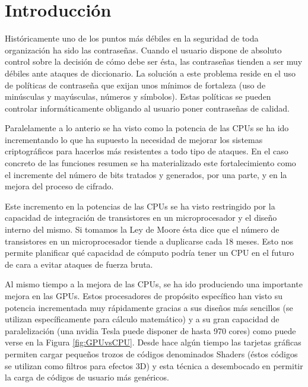 \chapter{Introducción}

Históricamente uno de los puntos más débiles en la seguridad de toda organización ha sido las contraseñas. Cuando el usuario dispone de absoluto control sobre la decisión de cómo debe ser ésta, las contraseñas tienden a ser muy débiles ante ataques de diccionario. La solución a este problema reside en el uso de políticas de contraseña que exijan unos mínimos de fortaleza (uso de minúsculas y mayúsculas, números y símbolos). Estas políticas se pueden controlar informáticamente obligando al usuario poner contraseñas de calidad.

Paralelamente a lo anterio se ha visto como la potencia de las CPUs se ha ido incrementando lo que ha supuesto la necesidad de mejorar los sistemas criptográficos para hacerlos más resistentes a todo tipo de ataques. En el caso concreto de las funciones resumen se ha materializado este fortalecimiento como el incremente del número de bits tratados y generados, por una parte, y en la mejora del proceso de cifrado.

Este incremento en la potencias de las CPUs se ha visto restringido por la capacidad de integración de transistores en un microprocesador y el diseño interno del mismo. Si tomamos la Ley de Moore ésta dice que el número de transistores en un microprocesador tiende a duplicarse cada 18 meses. Esto nos permite planificar qué capacidad de cómputo podría tener un CPU en el futuro de cara a evitar ataques de fuerza bruta.

Al mismo tiempo a la mejora de las CPUs, se ha ido produciendo una importante mejora en las GPUs. Estos procesadores de propósito específico han visto su potencia incrementada muy rápidamente gracias a sus diseños más sencillos (se utilizan específicamente para cálculo matemático) y a su gran capacidad de paralelización (una nvidia Tesla puede disponer de hasta 970 cores) como puede verse en la Figura \ref{fig:GPUvsCPU}. Desde hace algún tiempo las tarjetas gráficas permiten cargar pequeños trozos de códigos denominados Shaders (éstos códigos se utilizan como filtros para efectos 3D) y esta técnica a desembocado en permitir la carga de códigos de usuario más genéricos.

